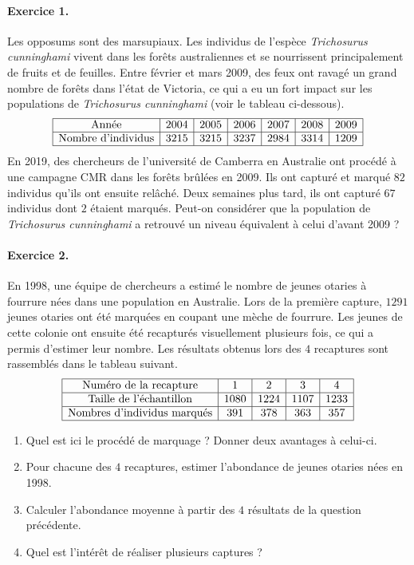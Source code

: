 \documentclass[11pt]{article}
\begin{document}

\paragraph{Exercice 1.} Les opposums sont des marsupiaux. Les individus de
l’espèce \emph{Trichosurus cunninghami} vivent dans les forêts australiennes et se nourrissent principalement de fruits et de
feuilles. Entre février et mars 2009, des feux ont ravagé un grand nombre de forêts dans l’état
de Victoria, ce qui a eu un fort impact sur les populations de \emph{Trichosurus
cunninghami} (voir le tableau ci-dessous).
\[
\begin{array}[]{|c|c|c|c|c|c|c|}
  \hline
  \text{Année} & 2004 & 2005 & 2006 & 2007 & 2008 & 2009 \\
  \hline
  \text{Nombre d'individus} & 3215 & 3215 & 3237 & 2984 & 3314 & 1209 \\
  \hline
\end{array}
\]
En 2019, des chercheurs de l’université de Camberra en Australie ont procédé à une campagne
CMR dans les forêts brûlées en 2009. Ils ont capturé et marqué $82$ individus qu’ils ont ensuite
relâché. Deux semaines plus tard, ils ont capturé $67$ individus dont $2$ étaient marqués.
Peut-on considérer que la population de \emph{Trichosurus cunninghami} a retrouvé un niveau
équivalent à celui d’avant 2009 ?

\paragraph{Exercice 2.} En 1998, une équipe de chercheurs a estimé le nombre de jeunes otaries à fourrure
nées dans une population en Australie. Lors de la première capture, $1291$ jeunes otaries ont
été marquées en coupant une mèche de fourrure. Les jeunes de cette colonie ont ensuite été
recapturés visuellement plusieurs fois, ce qui a permis d’estimer leur nombre. Les résultats
obtenus lors des $4$ recaptures sont rassemblés dans le tableau suivant.
\[
  \begin{array}{|c|c|c|c|c|}
    \hline
    \text{Numéro de la recapture} & 1 & 2 & 3 & 4 \\
    \hline
    \text{Taille de l'échantillon} & 1080 & 1224 & 1107 & 1233 \\
    \hline
    \text{Nombres d'individus marqués} & 391 & 378 & 363 & 357 \\
    \hline
  \end{array}
\]
\begin{enumerate}
  \item Quel est ici le procédé de marquage ? Donner deux avantages à celui-ci.
  \item Pour chacune des $4$ recaptures, estimer l'abondance de jeunes otaries
    nées en 1998.
  \item Calculer l'abondance moyenne à partir des $4$ résultats de la question
    précédente.
  \item Quel est l'intérêt de réaliser plusieurs captures ?
\end{enumerate}
\end{document}
